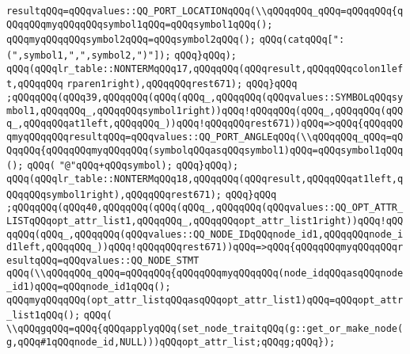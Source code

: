\verb|resultqQQq=qQQqvalues::QQ_PORT_LOCATIONqQQq(\\qQQqqQQq_qQQq=qQQqqQQq{qQQqqQQqmyqQQqqQQqsymbol1qQQq=qQQqsymbol1qQQq();|\newline
\verb|qQQqmyqQQqqQQqsymbol2qQQq=qQQqsymbol2qQQq();|\newline
\verb|qQQq(catqQQq[":(",symbol1,",",symbol2,")"]);|\newline
\verb|qQQq}qQQq);|\newline
\verb|qQQq(qQQqlr_table::NONTERMqQQq17,qQQqqQQq(qQQqresult,qQQqqQQqcolon1left,qQQqqQQq|\newline
\verb|rparen1right),qQQqqQQqrest671);|\newline
\verb|qQQq}qQQq|\newline
\verb|;qQQqqQQq(qQQq39,qQQqqQQq(qQQq(qQQq_,qQQqqQQq(qQQqvalues::SYMBOLqQQqsymbol1,qQQqqQQq_,qQQqqQQqsymbol1right))qQQq!qQQqqQQq(qQQq_,qQQqqQQq(qQQq_,qQQqqQQqat1left,qQQqqQQq_))qQQq!qQQqqQQqrest671))qQQq=>qQQq{qQQqqQQqmyqQQqqQQqresultqQQq=qQQqvalues::QQ_PORT_ANGLEqQQq(\\qQQqqQQq_qQQq=qQQqqQQq{qQQqqQQqmyqQQqqQQq(symbolqQQqasqQQqsymbol1)qQQq=qQQqsymbol1qQQq();|\newline
\verb|qQQq(|\newline
\verb|"@"qQQq+qQQqsymbol);|\newline
\verb|qQQq}qQQq);|\newline
\verb|qQQq(qQQqlr_table::NONTERMqQQq18,qQQqqQQq(qQQqresult,qQQqqQQqat1left,qQQqqQQqsymbol1right),qQQqqQQqrest671);|\newline
\verb|qQQq}qQQq|\newline
\verb|;qQQqqQQq(qQQq40,qQQqqQQq(qQQq(qQQq_,qQQqqQQq(qQQqvalues::QQ_OPT_ATTR_LISTqQQqopt_attr_list1,qQQqqQQq_,qQQqqQQqopt_attr_list1right))qQQq!qQQqqQQq(qQQq_,qQQqqQQq(qQQqvalues::QQ_NODE_IDqQQqnode_id1,qQQqqQQqnode_id1left,qQQqqQQq_))qQQq!qQQqqQQqrest671))qQQq=>qQQq{qQQqqQQqmyqQQqqQQqresultqQQq=qQQqvalues::QQ_NODE_STMT|\newline
\verb|qQQq(\\qQQqqQQq_qQQq=qQQqqQQq{qQQqqQQqmyqQQqqQQq(node_idqQQqasqQQqnode_id1)qQQq=qQQqnode_id1qQQq();|\newline
\verb|qQQqmyqQQqqQQq(opt_attr_listqQQqasqQQqopt_attr_list1)qQQq=qQQqopt_attr_list1qQQq();|\newline
\verb|qQQq(|\newline
\verb|\\qQQqgqQQq=qQQq{qQQqapplyqQQq(set_node_traitqQQq(g::get_or_make_node(g,qQQq#1qQQqnode_id,NULL)))qQQqopt_attr_list;qQQqg;qQQq});|\newline
